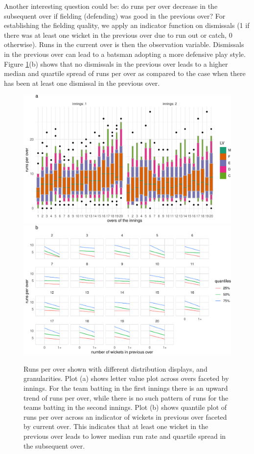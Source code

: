 \documentclass[
]{article}
\begin{document}
Another interesting question could be: do runs per over decrease in the subsequent over if fielding (defending) was good in the previous over? For establishing the fielding quality, we apply an indicator function on dismissals (1 if there was at least one wicket in the previous over due to run out or catch, 0 otherwise). Runs in the current over is then the observation variable. Dismissals in the previous over can lead to a batsman adopting a more defensive play style. Figure \ref{fig:cricex}(b) shows that no dismissals in the previous over leads to a higher median and quartile spread of runs per over as compared to the case when there has been at least one dismissal in the previous over.

\begin{figure}

{\centering \includegraphics[width=0.9\linewidth]{figure/cricex-1} \includegraphics[width=0.9\linewidth]{figure/cricex-2} 

}

\caption{Runs per over shown with different distribution displays, and granularities. Plot (a) shows letter value plot across overs faceted by innings. For the team batting in the first innings there is an upward trend of runs per over, while there is no such pattern of runs for the teams batting in the second innings. Plot (b) shows quantile plot of runs per over across an indicator of wickets in previous over faceted by current over. This indicates that at least one wicket in the previous over leads to lower median run rate and quartile spread in the subsequent over.}\label{fig:cricex}
\end{figure}
\end{document}
